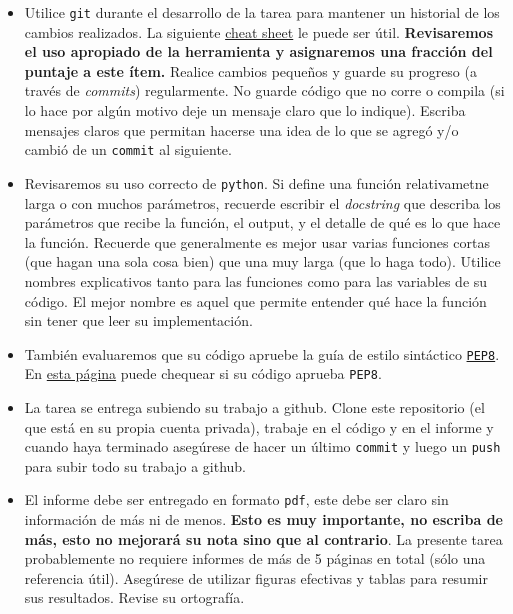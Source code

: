 \documentclass[letter, 11pt]{article}
\begin{document}
\vspace{1em}
\begin{itemize}

  \item Utilice \texttt{git} durante el desarrollo de la tarea para mantener un
    historial de los cambios realizados. La siguiente
    \href{https://education.github.com/git-cheat-sheet-education.pdf}{cheat
      sheet} le puede ser útil. \textbf{Revisaremos el uso apropiado
    de la herramienta y asignaremos una fracción del puntaje a este ítem.}
    Realice cambios pequeños y guarde su progreso (a través de \emph{commits})
    regularmente. No guarde código que no corre o compila (si lo hace por algún
    motivo deje un mensaje claro que lo indique). Escriba mensajes claros que
    permitan hacerse una idea de lo que se agregó y/o cambió de un
    \texttt{commit} al siguiente.

  \item Revisaremos su uso correcto de \texttt{python}. Si define una función
    relativametne larga o con muchos parámetros, recuerde escribir el
    \emph{docstring} que describa los parámetros que recibe la función, el
    output, y el detalle de qué es lo que hace la función. Recuerde que
    generalmente es mejor usar varias funciones cortas (que hagan una sola cosa
    bien) que una muy larga (que lo haga todo).  Utilice nombres explicativos
    tanto para las funciones como para las variables de su código.  El mejor
    nombre es aquel que permite entender qué hace la función sin tener que leer
    su implementación.

  \item También evaluaremos que su código apruebe la guía de estilo sintáctico
    \href{https://www.python.org/dev/peps/pep-0008/}{\texttt{PEP8}}. En
    \href{http://pep8online.com}{esta página} puede chequear si su código
    aprueba \texttt{PEP8}.

  \item La tarea se entrega subiendo su trabajo a github. Clone este
    repositorio (el que está en su propia cuenta privada), trabaje en el código
    y en el informe y cuando haya terminado asegúrese de hacer un último
    \texttt{commit} y luego un \texttt{push} para subir todo su trabajo a
    github.

  \item El informe debe ser entregado en formato \texttt{pdf}, este debe ser
    claro sin información de más ni de menos. \textbf{Esto es muy importante,
    no escriba de más, esto no mejorará su nota sino que al contrario}. La
    presente tarea probablemente no requiere informes de más de 5 páginas en
    total (sólo una referencia útil).  Asegúrese de utilizar figuras efectivas
    y tablas para resumir sus resultados. Revise su ortografía.


\end{itemize}
\end{document}
